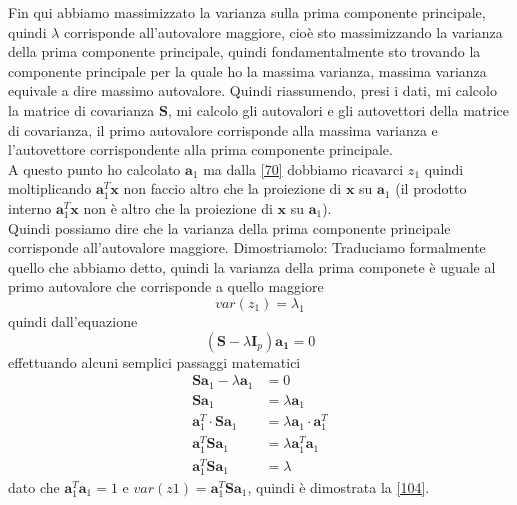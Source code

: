 \noindent Fin qui abbiamo massimizzato la varianza sulla prima componente principale, quindi $\lambda$ corrisponde all'autovalore maggiore, cioè sto massimizzando la varianza della prima componente principale, quindi fondamentalmente sto trovando la componente principale per la quale ho la massima varianza, massima varianza equivale a dire massimo autovalore. Quindi riassumendo, presi i dati, mi calcolo la matrice di covarianza $\mathbf{S}$, mi calcolo gli autovalori e gli autovettori della matrice di covarianza, il primo autovalore corrisponde alla massima varianza e l'autovettore corrispondente alla prima componente principale.\\
A questo punto ho calcolato $\mathbf{a}_1$ ma dalla \ref{70} dobbiamo ricavarci $z_1$ quindi moltiplicando $\mathbf{a}_1^T \mathbf{x}$ non faccio altro che la proiezione di $\mathbf{x}$ su $\mathbf{a}_1$ (il prodotto interno $\mathbf{a}_1^T \mathbf{x}$ non è altro che la proiezione di $\mathbf{x}$ su $\mathbf{a}_1$). \\
Quindi possiamo dire che la varianza della prima componente principale corrisponde all'autovalore maggiore. Dimostriamolo:
Traduciamo formalmente quello che abbiamo detto, quindi la varianza della prima componete è uguale al primo autovalore che corrisponde a quello maggiore
\begin{equation}\label{104}
var(z_1) = \lambda_1
\end{equation}
quindi dall'equazione
\begin{equation}
(\mathbf{S}-\lambda \mathbf{I}_p)\mathbf{a_1} = 0
\end{equation}
effettuando alcuni semplici passaggi matematici
\begin{equation}
\begin{split}
\mathbf{S}\mathbf{a}_1 - \lambda \mathbf{a}_1 &= 0 \\
\mathbf{S}\mathbf{a}_1 &=  \lambda \mathbf{a}_1\\ 
\mathbf{a}_1^T  \cdot \mathbf{S}\mathbf{a}_1 &=  \lambda \mathbf{a}_1 \cdot \mathbf{a}_1^T\\
\mathbf{a}_1^T\mathbf{S}\mathbf{a}_1 &=  \lambda \mathbf{a}_1^T\mathbf{a}_1\\
\mathbf{a}_1^T\mathbf{S}\mathbf{a}_1 &=  \lambda
\end{split}
\end{equation}
dato che $\mathbf{a}_1^T\mathbf{a}_1 =  1$ e $var(z1) = \mathbf{a}_1^T\mathbf{S}\mathbf{a}_1$, quindi è dimostrata la \ref{104}.\\


